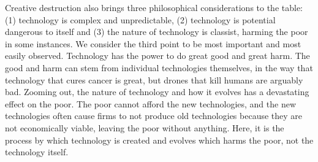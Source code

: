 \documentclass[11pt]{article}
\begin{document}
Creative destruction also brings three philosophical considerations to the table: (1) technology is complex and unpredictable, (2) technology is potential dangerous to itself and (3) the nature of technology is classist, harming the poor in some instances.
We consider the third point to be most important and most easily observed.
Technology has the power to do great good and great harm. 
The good and harm can stem from individual technologies themselves, in the way that technology that cures cancer is great, but drones that kill humans are arguably bad. 
Zooming out, the nature of technology and how it evolves has a devastating effect on the poor.
The poor cannot afford the new technologies, and the new technologies often cause firms to not produce old technologies because they are not economically viable, leaving the poor without anything. 
Here, it is the process by which technology is created and evolves which harms the poor, not the technology itself.



\end{document}
